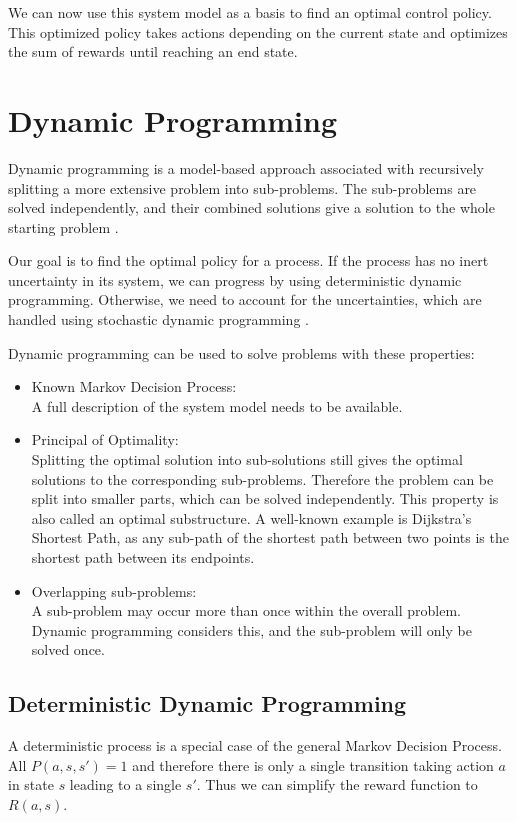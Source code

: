 We can now use this system model as a basis to find an optimal control policy. This optimized policy takes actions depending on the current state and optimizes the sum of rewards until reaching an end state.

\section{Dynamic Programming}
\label{sec:dp}

Dynamic programming is a model-based approach associated with recursively splitting a more extensive problem into sub-problems. The sub-problems are solved independently, and their combined solutions give a solution to the whole starting problem \cite{bellman1966dynamic}.

Our goal is to find the optimal policy for a process. If the process has no inert uncertainty in its system, we can progress by using deterministic dynamic programming. Otherwise, we need to account for the uncertainties, which are handled using stochastic dynamic programming \cite{bertsekas2012dynamic}.

Dynamic programming can be used to solve problems with these properties:
\begin{itemize}
	\setlength\itemsep{0.5em}
	\item Known Markov Decision Process:\\
	A full description of the system model needs to be available.
	
	\item Principal of Optimality:\\
	Splitting the optimal solution into sub-solutions still gives the optimal solutions to the corresponding sub-problems. Therefore the problem can be split into smaller parts, which can be solved independently. This property is also called an optimal substructure. A well-known example is Dijkstra's Shortest Path, as any sub-path of the shortest path between two points is the shortest path between its endpoints.
	
	\item Overlapping sub-problems:\\
	A sub-problem may occur more than once within the overall problem. Dynamic programming considers this, and the sub-problem will only be solved once.
\end{itemize}

\subsection{Deterministic Dynamic Programming}
\label{subsec:ddp}
A deterministic process is a special case of the general Markov Decision Process. All $P(a, s, s') = 1$ and therefore there is only a single transition taking action $a$ in state $s$ leading to a single $s'$. Thus we can simplify the reward function to $R(a,s)$.

